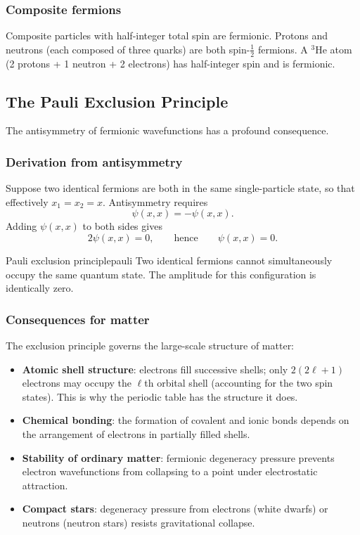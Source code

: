 \documentclass[11pt,a4paper]{article}
\begin{document}
\subsubsection{Composite fermions}

Composite particles with half-integer total spin are fermionic.  Protons and
neutrons (each composed of three quarks) are both spin-$\tfrac{1}{2}$ fermions.
A $^3\text{He}$ atom (2 protons + 1 neutron + 2 electrons) has half-integer spin
and is fermionic.

\subsection{The Pauli Exclusion Principle}

The antisymmetry of fermionic wavefunctions has a profound consequence.

\subsubsection{Derivation from antisymmetry}

Suppose two identical fermions are both in the same single-particle state,
so that effectively $x_1 = x_2 = x$.  Antisymmetry requires
\[
  \psi(x, x) = -\psi(x, x).
\]
Adding $\psi(x,x)$ to both sides gives
\[
  2\psi(x,x) = 0, \qquad\text{hence}\qquad \psi(x,x) = 0.
\]

\begin{thm}{Pauli exclusion principle}{pauli}
  Two identical fermions cannot simultaneously occupy the same quantum state.
  The amplitude for this configuration is identically zero.
\end{thm}

\subsubsection{Consequences for matter}

The exclusion principle governs the large-scale structure of matter:
\begin{itemize}
  \item \textbf{Atomic shell structure}: electrons fill successive shells; only
        $2(2\ell+1)$ electrons may occupy the $\ell$th orbital shell (accounting
        for the two spin states).  This is why the periodic table has the
        structure it does.
  \item \textbf{Chemical bonding}: the formation of covalent and ionic bonds
        depends on the arrangement of electrons in partially filled shells.
  \item \textbf{Stability of ordinary matter}: fermionic degeneracy pressure
        prevents electron wavefunctions from collapsing to a point under
        electrostatic attraction.
  \item \textbf{Compact stars}: degeneracy pressure from electrons (white dwarfs)
        or neutrons (neutron stars) resists gravitational collapse.
\end{itemize}
\end{document}
